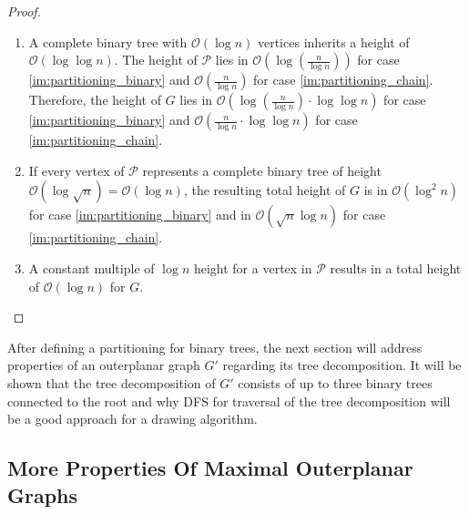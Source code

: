 \begin{proof}
\begin{enumerate}
		\item A complete binary tree with $\mathcal{O}(\log n)$ vertices inherits a height of $\mathcal{O}(\log \log n)$. The height of $\mathcal{P}$ lies in $\mathcal{O}\left(\log\left(\frac{n}{\log n}\right)\right)$ for case \ref{im:partitioning_binary} and $\mathcal{O}\left(\frac{n}{\log n}\right)$ for case \ref{im:partitioning_chain}. Therefore, the height of $G$ lies in $\mathcal{O}\left(\log\left(\frac{n}{\log n}\right)\cdot \log \log n \right)$ for case \ref{im:partitioning_binary} and $\mathcal{O}\left(\frac{n}{\log n}\cdot \log \log n\right)$ for case \ref{im:partitioning_chain}.
		\item If every vertex of $\mathcal{P}$ represents a complete binary tree of height $\mathcal{O}(\log \sqrt{n}) = \mathcal{O}(\log n)$, the resulting total height of $G$ is in $\mathcal{O}(\log^2 n)$ for case \ref{im:partitioning_binary} and in $\mathcal{O}(\sqrt{n} \log n)$ for case \ref{im:partitioning_chain}. 
		\item A constant multiple of $\log n$ height for a vertex in $\mathcal{P}$ results in a total height of $\mathcal{O}(\log n)$ for $G$.
	\end{enumerate}
\end{proof}

After defining a partitioning for binary trees, the next section will address properties of an outerplanar graph $G'$ regarding its tree decomposition. It will be shown that the tree decomposition of $G'$ consists of up to three binary trees connected to the root and why DFS for traversal of the tree decomposition will be a good approach for a drawing algorithm.

\subsection{More Properties Of Maximal Outerplanar Graphs}

